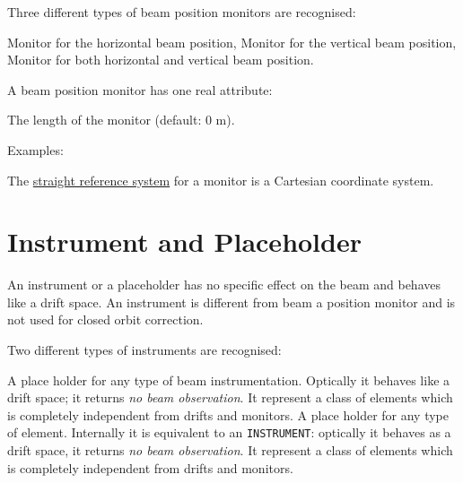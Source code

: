 Three different types of beam position monitors are recognised:
\begin{madlist}
    Monitor for the horizontal beam position,
    Monitor for the vertical beam position,
    Monitor for both horizontal and vertical beam position.
\end{madlist}


A beam position monitor has one real attribute:
\begin{madlist}
    The length of the monitor (default: 0 m).
\end{madlist}

Examples:

The \hyperref[subsec:local-straight]{straight reference system} for a
monitor is a Cartesian coordinate system.

\section{Instrument and Placeholder}
\label{sec:instrument}
\label{sec:placeholder}
An instrument or a placeholder has no specific effect on the beam and
behaves like a drift space.
An instrument is different from beam a position monitor and is not used
for closed orbit correction.

Two different types of instruments are recognised:

\begin{madlist}
    A place holder for any type of beam
     instrumentation. Optically it behaves like a drift space; it
     returns \emph{no beam observation}. It represent a class of
     elements which is completely independent from drifts and monitors.
    A place holder for any type of
     element. Internally it is equivalent to an \texttt{INSTRUMENT}:
     optically it behaves as a drift space, it returns
     \emph{no beam observation}. It represent a class of elements
     which is completely independent from drifts and monitors.
\end{madlist}

